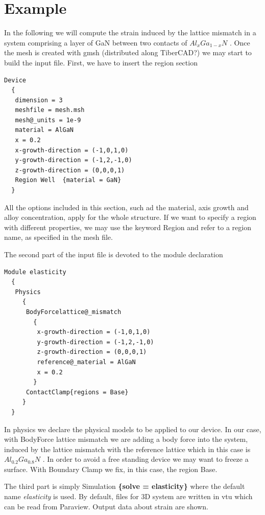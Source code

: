 \documentclass[letterpaper,10pt,english]{sphinxmanual}
\begin{document}
\section{Example}
\label{Elasticity:example}
In the following we will compute the strain induced by the lattice mismatch in a system comprising a layer of GaN between two contacts of $Al_{x}Ga_{1-x}N$ .
Once the mesh is created with gmsh (distributed along TiberCAD?) we may start to build the input file.
First, we have to insert the region section


\begin{Verbatim}[commandchars=@\[\]]
Device
  {
   dimension = 3
   meshfile = mesh.msh
   mesh@_units = 1e-9
   material = AlGaN
   x = 0.2
   x-growth-direction = (-1,0,1,0)
   y-growth-direction = (-1,2,-1,0)
   z-growth-direction = (0,0,0,1)
   Region Well  {material = GaN}
  }
\end{Verbatim}

All the options included in this section, such ad the material, axis growth and alloy concentration, apply for the whole structure.
If we want to specify a region with different properties, we may use the keyword Region and refer to a region name, as specified in the mesh file.


The second part of the input file is devoted to the module declaration


\begin{Verbatim}[commandchars=@\[\]]
Module elasticity
  {
   Physics
     {
      BodyForcelattice@_mismatch
        {
         x-growth-direction = (-1,0,1,0)
         y-growth-direction = (-1,2,-1,0)
         z-growth-direction = (0,0,0,1)
         reference@_material = AlGaN
         x = 0.2
        }
      ContactClamp{regions = Base}
     }
  }
\end{Verbatim}

In physics we declare the physical models to be applied to our device.
In our case, with BodyForce lattice mismatch we are adding a body force into the system, induced by the lattice mismatch with the reference lattice which in this case is $Al_{0.2}Ga_{0.8}N$ .
In order to avoid a free standing device we may want to freeze a surface. With Boundary Clamp we fix, in this case, the region Base.


The third part is simply Simulation \textbf{\{solve = elasticity\}} where the default name \emph{elasticity} is used.
By default, files for 3D system are written in vtu which can be read from Paraview.
Output data about strain are shown.
\end{document}
